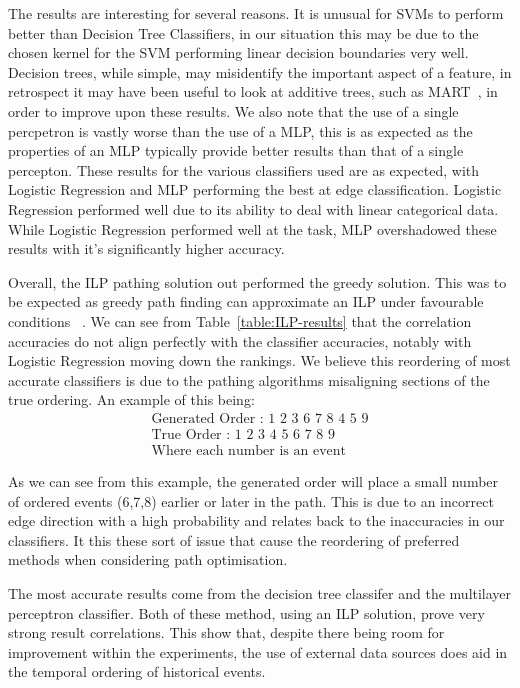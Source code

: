 \documentclass[bsc,frontabs,twoside,singlespacing,parskip,deptreport]{infthesis}     %
\begin{document}
The results are interesting for several reasons.
It is unusual for SVMs to perform better than Decision Tree Classifiers, in our situation this may be due to the chosen
kernel for the SVM performing linear decision boundaries very well. Decision trees, while simple, may misidentify the important
aspect of a  feature, in retrospect it may have been useful to look at additive trees, such as MART~\cite{friedman2001greedy}, in order to
improve upon these results.
We also note that the use of a single percpetron is vastly worse than the use of a MLP, this is as expected as
the properties of an MLP typically provide better results than that of a single percepton.
These results for the various classifiers used are as expected, with Logistic Regression and MLP performing the best
at edge classification. Logistic Regression performed well due to its ability to deal with linear categorical data.
While Logistic Regression performed well at the task, MLP overshadowed these results with it's significantly higher
accuracy. 


Overall, the ILP pathing solution out performed the greedy solution. This was to be expected as greedy path finding can
approximate an ILP under favourable conditions ~\cite{schapire1998learning}. We can see from Table~\ref{table:ILP-results} that the
correlation accuracies do not align perfectly with the classifier accuracies, notably with Logistic Regression moving
down the rankings. We believe this reordering of most accurate classifiers is due to the pathing algorithms misaligning
sections of the true ordering. An example of this being:
\begin{align}\nonumber
  \text{Generated Order : 1 2 3 6 7 8 4 5 9}\\\nonumber
  \text{True Order : 1 2 3 4 5 6 7 8 9}\\\nonumber
  \text{Where each number is an event}\nonumber
\end{align}

As we can see from this example, the generated order will place a small number of ordered events (6,7,8) earlier or
later in the path. This is due to an incorrect edge direction with a high probability and relates back to the
inaccuracies in our classifiers. It this these sort of issue that cause the reordering of preferred methods when considering
path optimisation.

The most accurate results come from the decision tree classifer and the multilayer perceptron classifier.
Both of these method, using an ILP solution, prove very strong result correlations. This show that, despite there
being room for improvement within the experiments, the use of external data sources does aid in the temporal ordering
of historical events.
\end{document}
